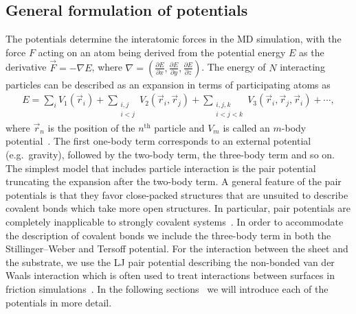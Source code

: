 \subsection{General formulation of potentials}
The potentials determine the interatomic forces in the \acrshort{MD} simulation, with the force $F$ acting on an atom being derived from the potential energy $E$ as the derivative $\vec{F} = -\nabla E$, where $\nabla = (\frac{\partial E}{\partial x}, \frac{\partial E}{\partial y}, \frac{\partial E}{\partial z})$. The energy of $N$ interacting particles can be described as an expansion in terms of participating atoms as 
\begin{align*}
  E = \sum_i V_1(\vec{r}_i) + 
      \sum_{\substack{i, j \\ i < j}} V_2(\vec{r}_i, \vec{r}_j) +  
      \sum_{\substack{i,j,k \\ i < j < k}} V_3(\vec{r}_i, \vec{r}_j, \vec{r}_i) + \cdots,
\end{align*} 
where $\vec{r}_n$ is the position of the $n^{\text{th}}$ particle and $V_m$ is called an $m$-body potential~\cite{PhysRevB.37.6991}. The first one-body term corresponds
to an external potential (e.g.\ gravity), followed by the two-body term, the
three-body term and so on. The simplest model that includes particle interaction
is the pair potential truncating the expansion after the two-body term. A general feature of the pair potentials is that they favor close-packed
structures that are unsuited to describe covalent bonds which take more open
structures. In particular, pair potentials are completely inapplicable to
strongly covalent systems~\cite{PhysRevB.37.6991}. In order to accommodate the
description of covalent bonds we include the three-body term in both the Stillinger–Weber and Tersoff potential. For the interaction between the sheet and the substrate, we use the \acrshort{LJ} pair potential describing the non-bonded van der Waals interaction which is often used to treat interactions between surfaces in friction simulations~\cite{zhu_study_2018,ZHANG201585,Yoon2015MolecularDS,kim_nano-scale_2009}. In the following sections~ we will introduce each of the potentials in more detail.


